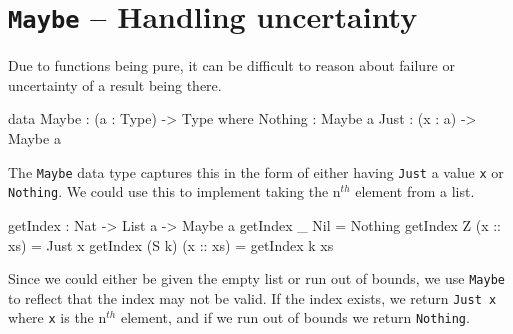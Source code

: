 \section{\texttt{Maybe} -- Handling uncertainty}
    Due to functions being pure, it can be difficult to reason about failure or uncertainty of a result being there.
    \begin{code}[caption={The \texttt{Maybe} data type}]
        data Maybe : (a : Type) -> Type where
            Nothing : Maybe a
            Just : (x : a) -> Maybe a
    \end{code}
    The \texttt{Maybe} data type captures this in the form of either having \texttt{Just} a value \texttt{x} or \texttt{Nothing}. We could use this to implement taking the n$^{th}$ element from a list.
    \begin{code}[caption={List indexing using \texttt{Maybe}}]
        getIndex : Nat -> List a -> Maybe a
        getIndex _ Nil = Nothing
        getIndex Z (x :: xs) = Just x
        getIndex (S k) (x :: xs) = getIndex k xs
    \end{code}
    Since we could either be given the empty list or run out of bounds, we use \texttt{Maybe} to reflect that the index may not be valid. If the index exists, we return \texttt{Just x} where \texttt{x} is the n$^{th}$ element, and if we run out of bounds we return \texttt{Nothing}.

